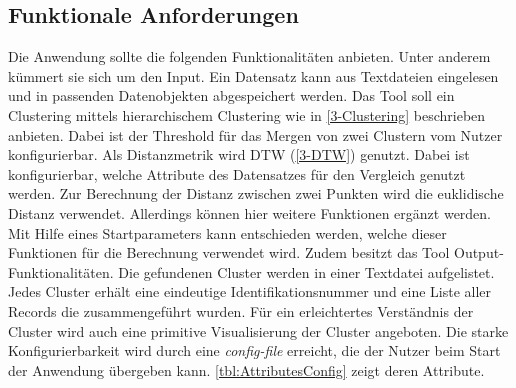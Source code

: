 \subsection{Funktionale Anforderungen}
\label{4-FunktionaleAnforderungen}
Die Anwendung sollte die folgenden Funktionalitäten anbieten.
Unter anderem kümmert sie sich um den Input.
Ein Datensatz kann aus Textdateien eingelesen und in passenden Datenobjekten abgespeichert werden.
Das Tool soll ein Clustering mittels hierarchischem Clustering wie in \autoref{3-Clustering} beschrieben anbieten.
Dabei ist der Threshold für das Mergen von zwei Clustern vom Nutzer konfigurierbar.
Als Distanzmetrik wird \ac{DTW} (\autoref{3-DTW}) genutzt.
Dabei ist konfigurierbar, welche Attribute des Datensatzes für den Vergleich genutzt werden.
Zur Berechnung der Distanz zwischen zwei Punkten wird die euklidische Distanz verwendet.
Allerdings können hier weitere Funktionen ergänzt werden.
Mit Hilfe eines Startparameters kann entschieden werden, welche dieser Funktionen für die Berechnung verwendet wird.
Zudem besitzt das Tool Output-Funktionalitäten.
Die gefundenen Cluster werden in einer Textdatei aufgelistet.
Jedes Cluster erhält eine eindeutige Identifikationsnummer und eine Liste aller Records die zusammengeführt wurden.
Für ein erleichtertes Verständnis der Cluster wird auch eine primitive Visualisierung der Cluster angeboten.
Die starke Konfigurierbarkeit wird durch eine \emph{config-file} erreicht,
die der Nutzer beim Start der Anwendung übergeben kann.
\autoref{tbl:AttributesConfig} zeigt deren Attribute.
